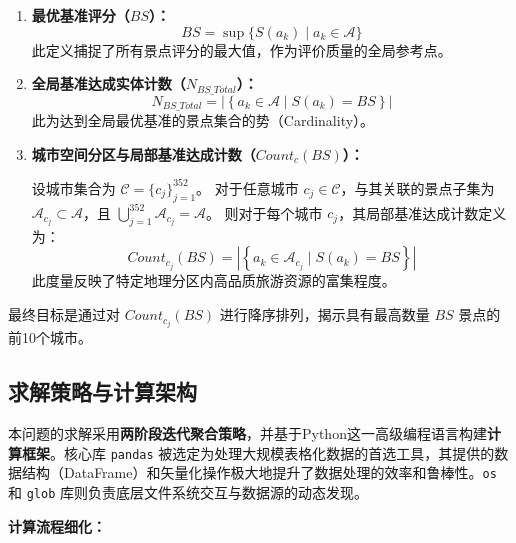 \documentclass[12pt]{article}
\begin{document}
\begin{enumerate}
    \item \textbf{最优基准评分（$BS$）：}
    \begin{equation}
    BS = \sup \{S(a_k) \mid a_k \in \mathcal{A}\}
    \end{equation}
    此定义捕捉了所有景点评分的最大值，作为评价质量的全局参考点。

    \item \textbf{全局基准达成实体计数（$N_{BS\_Total}$）：}
    \begin{equation}
    N_{BS\_Total} = |\left\{a_k \in \mathcal{A} \mid S(a_k) = BS\right\}|
    \end{equation}
    此为达到全局最优基准的景点集合的势（Cardinality）。

    \item \textbf{城市空间分区与局部基准达成计数（$Count_{c}(BS)$）：}
    
    设城市集合为 $\mathcal{C} = \{c_j\}_{j=1}^{352}$。
    对于任意城市 $c_j \in \mathcal{C}$，与其关联的景点子集为 $\mathcal{A}_{c_j} \subset \mathcal{A}$，且 $\bigcup_{j=1}^{352} \mathcal{A}_{c_j} = \mathcal{A}$。
    则对于每个城市 $c_j$，其局部基准达成计数定义为：
    \begin{equation}
    Count_{c_j}(BS) = |\left\{a_k \in \mathcal{A}_{c_j} \mid S(a_k) = BS\right\}|
    \end{equation}
    此度量反映了特定地理分区内高品质旅游资源的富集程度。
\end{enumerate}

最终目标是通过对 $Count_{c_j}(BS)$ 进行降序排列，揭示具有最高数量 $BS$ 景点的前10个城市。

\subsection{求解策略与计算架构}

本问题的求解采用\textbf{两阶段迭代聚合策略}，并基于Python这一高级编程语言构建\textbf{计算框架}。核心库 \texttt{pandas} 被选定为处理大规模表格化数据的首选工具，其提供的数据结构（DataFrame）和矢量化操作极大地提升了数据处理的效率和鲁棒性。\texttt{os} 和 \texttt{glob} 库则负责底层文件系统交互与数据源的动态发现。

\textbf{计算流程细化：}
\end{document}
